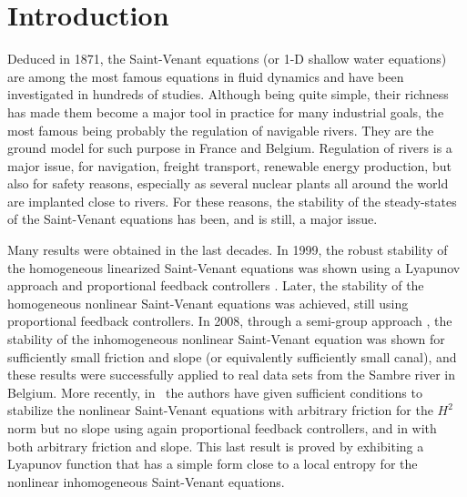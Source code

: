 \documentclass[11pt]{article}
\numberwithin{equation}{section}
\theoremstyle{definition}
\begin{document}
\section*{Introduction}
{Deduced} in 1871, the Saint-Venant equations \cite{SaintVenant} (or 1-D shallow water equations) are among the most famous equations in fluid dynamics and have been investigated in hundreds of studies.
Although being quite simple, their richness has made them become a major tool in practice for many industrial goals, the most famous being probably the regulation of navigable rivers.
They are the ground model for such purpose in France and Belgium.
Regulation of rivers
is a major issue, for navigation, freight transport,
renewable energy production,
but also for safety reasons, especially as
several nuclear plants all around the world are implanted close to rivers.
For these reasons, the stability of the steady-states of the Saint-Venant equations has been, and is still, a major issue.

Many results were obtained in the last decades.
In 1999, the robust stability of the homogeneous linearized Saint-Venant equations was shown using a Lyapunov approach and proportional feedback controllers \cite{coron1999}.
Later, the stability of the homogeneous nonlinear Saint-Venant equations was achieved, still using proportional feedback controllers.
In 2008, through a semi-group approach \cite{dos2008}, the stability of the inhomogeneous nonlinear Saint-Venant equation was shown for sufficiently small friction and slope (or equivalently sufficiently small canal), and these results were successfully applied to real data sets from the Sambre river in Belgium.
More recently, in~\cite{BC2017} the authors have given sufficient conditions to stabilize the nonlinear Saint-Venant equations with arbitrary friction for the $H^{2}$ norm but no slope using again proportional feedback controllers,
and in \cite{HS} with both arbitrary friction and slope.
This last result is proved by exhibiting {a Lyapunov function that has a simple form close to a local entropy} for the nonlinear inhomogeneous Saint-Venant equations.
\end{document}
